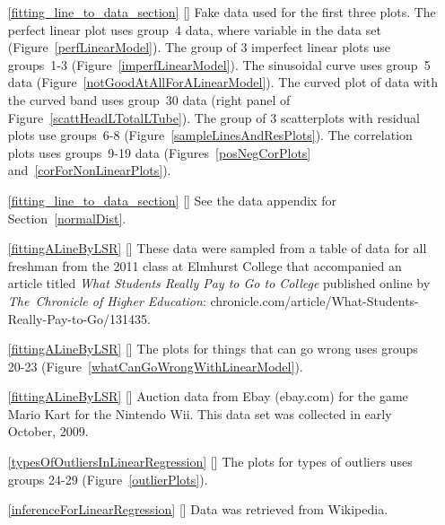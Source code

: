 \begin{itemize}
\item[\ref{fitting_line_to_data_section}]
    [\datalink{simulated\_scatter}]
    Fake data used for the first three plots.
    The perfect linear plot uses group~4 data,
    where  variable in the data set
    (Figure~\ref{perfLinearModel}).
    The group of 3 imperfect linear plots use groups~1-3
    (Figure~\ref{imperfLinearModel}).
    The sinusoidal curve uses group~5 data
    (Figure~\ref{notGoodAtAllForALinearModel}).
    The curved plot of data with the curved band
    uses group~30 data
    (right panel of Figure~\ref{scattHeadLTotalLTube}).
    The group of 3 scatterplots with residual plots use groups~6-8
    (Figure~\ref{sampleLinesAndResPlots}).
    The correlation plots uses groups~9-19 data
    (Figures~\ref{posNegCorPlots} and~\ref{corForNonLinearPlots}).
\item[\ref{fitting_line_to_data_section}]
    [\datalink{possum}]
    See the data appendix for Section~\ref{normalDist}.

\item[\ref{fittingALineByLSR}]
    [\datalink{elmhurst}]
    These data were sampled from a table of data for all
    freshman from the 2011 class at Elmhurst College that
    accompanied an article titled
    \emph{What Students Really Pay to Go to College}
    published online by \emph{The~Chronicle of Higher Education}:
        {chronicle.com/article/What-Students-Really-Pay-to-Go/131435}.
\item[\ref{fittingALineByLSR}]
    [\datalink{simulated\_scatter}]
    The plots for things that can go wrong uses groups 20-23
    (Figure~\ref{whatCanGoWrongWithLinearModel}).
\item[\ref{fittingALineByLSR}]
    [\datalink{mario\_kart}]
    Auction data from Ebay (ebay.com) for the game Mario Kart
    for the Nintendo Wii.
    This data set was collected in early October, 2009.

\item[\ref{typesOfOutliersInLinearRegression}]
    [\datalink{simulated\_scatter}]
    The plots for types of outliers uses groups 24-29
    (Figure~\ref{outlierPlots}).

\item[\ref{inferenceForLinearRegression}]
    [\datalink{midterms\_house}]
    Data was retrieved from Wikipedia.

\end{itemize}







